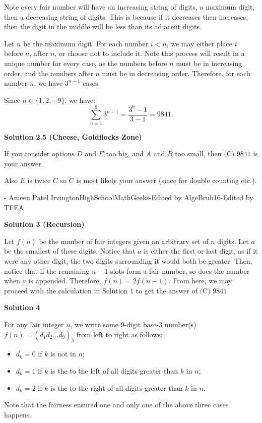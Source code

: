 \begin{enumerate}
Note every fair number will have an increasing string of digits, a maximum digit, then a decreasing string of digits. This is because if it decreases then increases, then the digit in the middle will be less than its adjacent digits.

 Let $n$ be the maximum digit. For each number $i<n$, we may either place $i$ before $n$, after $n$, or choose not to include it. Note this process will result in a unique number for every case, as the numbers before $n$ must be in increasing order, and the numbers after $n$ must be in decreasing order. Therefore, for each number $n$, we have $3^{n-1}$ cases.

 Since $n \in \{1,2,\cdots9\}$, we have:
 \[\sum_{n=1}^9 3^{n-1}=\frac{3^9-1}{3-1}=\boxed{9841}.\]




\textbf{Solution 2.5 (Cheese, Goldilocks Zone)}

If you consider options $D$ and $E$ too big, and $A$ and $B$ too small, then $\boxed {\text {(C) } 9841}$ is your answer.

 Also $E$ is twice $C$ so $C$ is most likely your answer (since for double counting etc.). 

 - Ameen Patel IrvingtonHighSchoolMathGeeks-Edited by AlgeBruh16-Edited by TFEA

 



\textbf{Solution 3 (Recursion)}

Let $f(n)$ be the number of fair integers given an arbitrary set of $n$ digits. Let $a$ be the smallest of these digits. Notice that $a$ is either the first or last digit, as if it were any other digit, the two digits surrounding it would both be greater. Then, notice that if the remaining $n-1$ slots form a fair number, so does the number when $a$ is appended. Therefore, $f(n) = 2f(n-1)$. From here, we may proceed with the calculation in Solution $1$ to get the answer of $\boxed {\text {(C) } 9841}$




\textbf{Solution 4}

For any fair integer $n$, we write some $9$-digit base-$3$ number(s) $f(n)=\left(\overline{d_1 d_2 \ldots d_9}\right)_3$ from left to right as follows:

 
            \begin{itemize}
        \item $d_k=0$ if $k$ is not in $n$;
        \item $d_k=1$ if $k$ is the to the left of all digits greater than $k$ in $n$;
        \item $d_k=2$ if $k$ is the to the right of all digits greater than $k$ in $n$.
            \end{itemize}
            Note that the fairness ensured one and only one of the above three cases happens. 


\end{enumerate}
